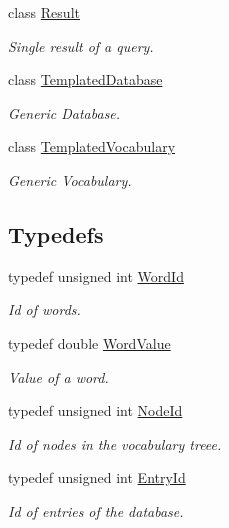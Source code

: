 \begin{DoxyCompactItemize}
class \hyperlink{classDBoW2_1_1Result}{Result}
\begin{DoxyCompactList}\small\item\em Single result of a query. \end{DoxyCompactList}\item 
class \hyperlink{classDBoW2_1_1TemplatedDatabase}{Templated\+Database}
\begin{DoxyCompactList}\small\item\em Generic Database. \end{DoxyCompactList}\item 
class \hyperlink{classDBoW2_1_1TemplatedVocabulary}{Templated\+Vocabulary}
\begin{DoxyCompactList}\small\item\em Generic Vocabulary. \end{DoxyCompactList}\end{DoxyCompactItemize}
\subsection*{Typedefs}
\begin{DoxyCompactItemize}
\item 
\mbox{\label{namespaceDBoW2_ab1a0d3283b2d4690a383372ed20bfeb5}} 
typedef unsigned int \hyperlink{namespaceDBoW2_ab1a0d3283b2d4690a383372ed20bfeb5}{Word\+Id}
\begin{DoxyCompactList}\small\item\em Id of words. \end{DoxyCompactList}\item 
\mbox{\label{namespaceDBoW2_a55fcd7333e591a38e96b91f41bc182f6}} 
typedef double \hyperlink{namespaceDBoW2_a55fcd7333e591a38e96b91f41bc182f6}{Word\+Value}
\begin{DoxyCompactList}\small\item\em Value of a word. \end{DoxyCompactList}\item 
\mbox{\label{namespaceDBoW2_a3a0fa9c50c0df508759362d6204566f2}} 
typedef unsigned int \hyperlink{namespaceDBoW2_a3a0fa9c50c0df508759362d6204566f2}{Node\+Id}
\begin{DoxyCompactList}\small\item\em Id of nodes in the vocabulary treee. \end{DoxyCompactList}\item 
\mbox{\label{namespaceDBoW2_a060a36cf320e6e831ee98915c19c1623}} 
typedef unsigned int \hyperlink{namespaceDBoW2_a060a36cf320e6e831ee98915c19c1623}{Entry\+Id}
\begin{DoxyCompactList}\small\item\em Id of entries of the database. \end{DoxyCompactList}\end{DoxyCompactItemize}
